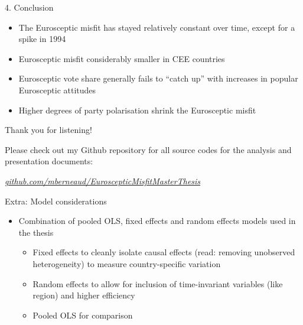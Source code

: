 \begin{frame}{4. Conclusion}

\begin{itemize}
\tightlist
\item
  The Eurosceptic misfit has stayed relatively constant over time,
  except for a spike in 1994
\item
  Eurosceptic misfit considerably smaller in CEE countries
\item
  Eurosceptic vote share generally fails to ``catch up'' with increases
  in popular Eurosceptic attitudes
\item
  Higher degrees of party polarisation shrink the Eurosceptic misfit
\end{itemize}

\end{frame}

\begin{frame}{Thank you for listening!}

Please check out my Github repository for all source codes for the
analysis and presentation documents:

\href{https://github.com/mberneaud/EuroscepticMisfitMasterThesis}{\emph{github.com/mberneaud/EuroscepticMisfitMasterThesis}}

\end{frame}

\begin{frame}{Extra: Model considerations}

\begin{itemize}
\tightlist
\item
  Combination of pooled OLS, fixed effects and random effects models
  used in the thesis

  \begin{itemize}
  \tightlist
  \item
    Fixed effects to cleanly isolate causal effects (read: removing
    unobserved heterogeneity) to measure country-specific variation
  \item
    Random effects to allow for inclusion of time-invariant variables
    (like region) and higher efficiency
  \item
    Pooled OLS for comparison
  \end{itemize}
\end{itemize}

\end{frame}
